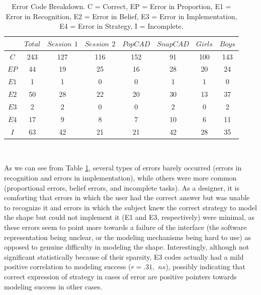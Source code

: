 \begin{table}[!ht] 
\small
    \caption[Modeling Error Code Breakdown]{Error Code Breakdown. C = Correct,
    EP = Error in Proportion, E1 = Error in Recognition, E2 = Error in Belief,
    E3 = Error in Implementation, E4 = Error in Strategy, I = Incomplete.}
    \begin{center}
    \begin{tabular}{| c | c | c | c | c | c | c | c |}
    \hline $ $ & $Total$ & $Session$ $1$ & $Session$ $2$ & $PopCAD$ & $SnapCAD$
    & $Girls$ & $Boys$\\ \hline 
    $C$  & 243 & 127 & 116 & 152& 91 & 100 & 143 \\ \hline
	$EP$ & 44  & 19  & 25  & 16 & 28 & 20  & 24 \\ \hline
	$E1$ & 1   & 1   & 0   & 0  & 1  & 1   & 0 \\ \hline
	$E2$ & 50  & 28	 & 22  & 20 & 30 & 13  & 37 \\ \hline
	$E3$ & 2   & 2   & 0   & 0  & 2  &	0  & 2 \\ \hline
	$E4$ & 17  & 9   & 8   & 7  & 10  & 6   & 11 \\ \hline
	$I$  & 63  & 42  & 21  & 21 & 42 & 28  & 35 \\ \hline
	\end{tabular}
   \\ \rule{0mm}{5mm}
\end{center}
\label{modelErrors}
\end{table}

As we can see from Table \ref{modelErrors}, several types of errors barely
occurred (errors in recognition and errors in implementation), while others were
more common (proportional errors, belief errors, and incomplete tasks). As a
designer, it is comforting that errors in which the user had the correct answer
but was unable to recognize it and errors in which the subject knew the correct
strategy to model the shape but could not implement it (E1 and E3, respectively)
were minimal, as these errors seem to point more towards a failure of the
interface (the software representation being unclear, or the modeling mechanisms
being hard to use) as opposed to genuine difficulty in modeling the shape.
Interestingly, although not significant statistically because of their sparsity,
E3 codes actually had a mild positive correlation to modeling success ($r=.31,$
 $ns$), possibly indicating that correct expression of strategy in cases of
error are positive pointers towards modeling success in other cases.

